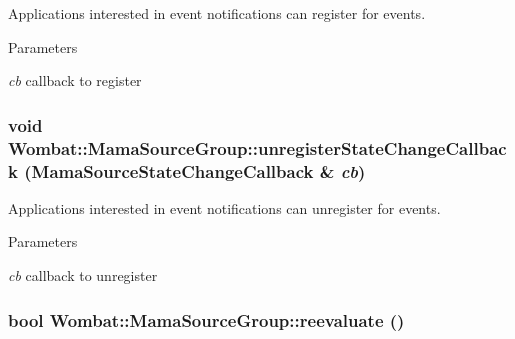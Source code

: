 Applications interested in event notifications can register for events. 
\begin{DoxyParams}{Parameters}
\item[{\em cb}]callback to register \end{DoxyParams}
\hypertarget{classWombat_1_1MamaSourceGroup_a0ff2b125e45621698846c15e6c954727}{
\subsubsection[{unregisterStateChangeCallback}]{\setlength{\rightskip}{0pt plus 5cm}void Wombat::MamaSourceGroup::unregisterStateChangeCallback ({\bf MamaSourceStateChangeCallback} \& {\em cb})}}
\label{classWombat_1_1MamaSourceGroup_a0ff2b125e45621698846c15e6c954727}


Applications interested in event notifications can unregister for events. 
\begin{DoxyParams}{Parameters}
\item[{\em cb}]callback to unregister \end{DoxyParams}
\hypertarget{classWombat_1_1MamaSourceGroup_a4495552ed7ff2748e10749558652792a}{
\subsubsection[{reevaluate}]{\setlength{\rightskip}{0pt plus 5cm}bool Wombat::MamaSourceGroup::reevaluate ()}}
\label{classWombat_1_1MamaSourceGroup_a4495552ed7ff2748e10749558652792a}



